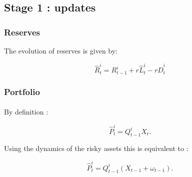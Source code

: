 \documentclass{article}
\newcommand{\wh}{\widehat}
\begin{document}
\subsection{Stage 1 : updates}\label{updates}

\subsubsection{Reserves}

The evolution of reserves is given by: 

\begin{equation}\label{eq:rsv}
\widehat{R}_t^i = R_{t-1}^i + r \wh L_t^i - r \wh D_t^i
\end{equation}



\subsubsection{Portfolio}

\paragraph{}


By definition : 

$$\widehat{P}_t^{i} = Q_{t-1}^i X_t.$$

Using the dynamics of the risky assets this is equivalent to : 

$$ \widehat{P}_t^{i} = Q_{t-1}^i (X_{t-1} + \omega_{t-1}).$$
\end{document}

